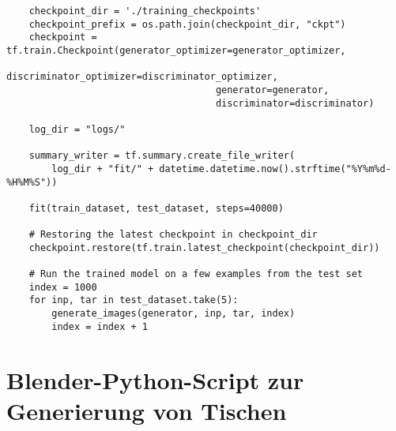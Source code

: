 \begin{lstlisting}
    checkpoint_dir = './training_checkpoints'
    checkpoint_prefix = os.path.join(checkpoint_dir, "ckpt")
    checkpoint = tf.train.Checkpoint(generator_optimizer=generator_optimizer,
                                     discriminator_optimizer=discriminator_optimizer,
                                     generator=generator,
                                     discriminator=discriminator)

    log_dir = "logs/"

    summary_writer = tf.summary.create_file_writer(
        log_dir + "fit/" + datetime.datetime.now().strftime("%Y%m%d-%H%M%S"))

    fit(train_dataset, test_dataset, steps=40000)

    # Restoring the latest checkpoint in checkpoint_dir
    checkpoint.restore(tf.train.latest_checkpoint(checkpoint_dir))

    # Run the trained model on a few examples from the test set
    index = 1000
    for inp, tar in test_dataset.take(5):
        generate_images(generator, inp, tar, index)
        index = index + 1

\end{lstlisting}

\pagebreak

\section{Blender-Python-Script zur Generierung von Tischen}
\label{blenderpy}

